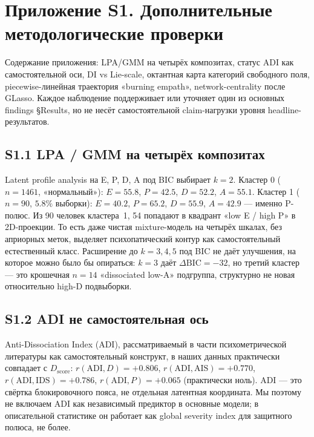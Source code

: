 
\appendix
\section*{Приложение S1. Дополнительные методологические проверки}
\label{supp:round3}

Содержание приложения: LPA/GMM на четырёх композитах, статус ADI как самостоятельной оси, DI vs Lie-scale, октантная карта категорий свободного поля, piecewise-линейная траектория «burning empath», network-centrality после GLasso. Каждое наблюдение поддерживает или уточняет один из основных findings §Results, но не несёт самостоятельной claim-нагрузки уровня headline-результатов.

\subsection*{S1.1 LPA / GMM на четырёх композитах}
Latent profile analysis на E, P, D, A под BIC выбирает $k=2$. Кластер 0 ($n = 1461$, «нормальный»): $E = 55.8$, $P = 42.5$, $D = 52.2$, $A = 55.1$. Кластер 1 ($n = 90$, $5.8\%$ выборки): $E = 40.2$, $P = 65.2$, $D = 55.9$, $A = 42.9$ --- именно P-полюс. Из 90 человек кластера~1, 54 попадают в квадрант «low E / high P» в 2D-проекции. То есть даже чистая mixture-модель на четырёх шкалах, без априорных меток, выделяет психопатический контур как самостоятельный естественный класс. Расширение до $k=3, 4, 5$ под BIC не даёт улучшения, на которое можно было бы опираться: $k=3$ даёт $\Delta\mathrm{BIC} = -32$, но третий кластер --- это крошечная $n = 14$ «dissociated low-A» подгруппа, структурно не новая относительно high-D подвыборки.

\subsection*{S1.2 ADI не самостоятельная ось}
Anti-Dissociation Index (ADI), рассматриваемый в части психометрической литературы как самостоятельный конструкт, в наших данных практически совпадает с $D_{\mathrm{score}}$: $r(\mathrm{ADI}, D) = +0.806$, $r(\mathrm{ADI}, \mathrm{AIS}) = +0.770$, $r(\mathrm{ADI}, \mathrm{IDS}) = +0.786$, $r(\mathrm{ADI}, P) = +0.065$ (практически ноль). ADI --- это свёртка блокировочного пояса, не отдельная латентная координата. Мы поэтому не включаем ADI как независимый предиктор в основные модели; в описательной статистике он работает как global severity index для защитного полюса, не более.

